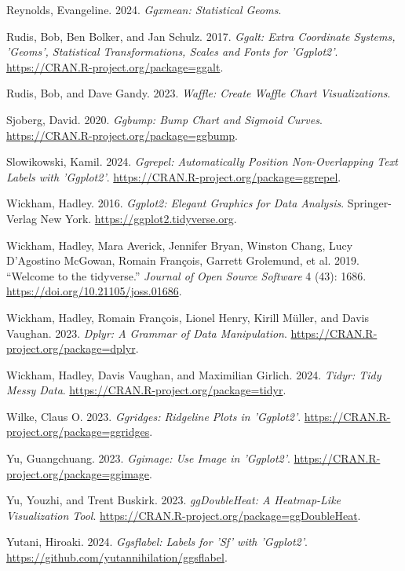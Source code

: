 \documentclass[
  letterpaper,
  DIV=11,
  numbers=noendperiod]{scrreprt}
\newlength{\cslhangindent}
\newenvironment{CSLReferences}[2] %
 {\begin{list}{}{%
  \setlength{\itemindent}{0pt}
  \setlength{\leftmargin}{0pt}
  \setlength{\parsep}{0pt}
  \ifodd #1
   \setlength{\leftmargin}{\cslhangindent}
   \setlength{\itemindent}{-1\cslhangindent}
  \fi
  \setlength{\itemsep}{#2\baselineskip}}}
 {\end{list}}
\begin{document}
\begin{CSLReferences}{1}{0}
Reynolds, Evangeline. 2024. \emph{Ggxmean: Statistical Geoms}.

Rudis, Bob, Ben Bolker, and Jan Schulz. 2017. \emph{Ggalt: Extra
Coordinate Systems, 'Geoms', Statistical Transformations, Scales and
Fonts for 'Ggplot2'}. \url{https://CRAN.R-project.org/package=ggalt}.

Rudis, Bob, and Dave Gandy. 2023. \emph{Waffle: Create Waffle Chart
Visualizations}.

Sjoberg, David. 2020. \emph{Ggbump: Bump Chart and Sigmoid Curves}.
\url{https://CRAN.R-project.org/package=ggbump}.

Slowikowski, Kamil. 2024. \emph{Ggrepel: Automatically Position
Non-Overlapping Text Labels with 'Ggplot2'}.
\url{https://CRAN.R-project.org/package=ggrepel}.

Wickham, Hadley. 2016. \emph{Ggplot2: Elegant Graphics for Data
Analysis}. Springer-Verlag New York.
\url{https://ggplot2.tidyverse.org}.

Wickham, Hadley, Mara Averick, Jennifer Bryan, Winston Chang, Lucy
D'Agostino McGowan, Romain François, Garrett Grolemund, et al. 2019.
{``Welcome to the {tidyverse}.''} \emph{Journal of Open Source Software}
4 (43): 1686. \url{https://doi.org/10.21105/joss.01686}.

Wickham, Hadley, Romain François, Lionel Henry, Kirill Müller, and Davis
Vaughan. 2023. \emph{Dplyr: A Grammar of Data Manipulation}.
\url{https://CRAN.R-project.org/package=dplyr}.

Wickham, Hadley, Davis Vaughan, and Maximilian Girlich. 2024.
\emph{Tidyr: Tidy Messy Data}.
\url{https://CRAN.R-project.org/package=tidyr}.

Wilke, Claus O. 2023. \emph{Ggridges: Ridgeline Plots in 'Ggplot2'}.
\url{https://CRAN.R-project.org/package=ggridges}.

Yu, Guangchuang. 2023. \emph{Ggimage: Use Image in 'Ggplot2'}.
\url{https://CRAN.R-project.org/package=ggimage}.

Yu, Youzhi, and Trent Buskirk. 2023. \emph{ggDoubleHeat: A Heatmap-Like
Visualization Tool}.
\url{https://CRAN.R-project.org/package=ggDoubleHeat}.

Yutani, Hiroaki. 2024. \emph{Ggsflabel: Labels for 'Sf' with 'Ggplot2'}.
\url{https://github.com/yutannihilation/ggsflabel}.

\end{CSLReferences}
\end{document}
